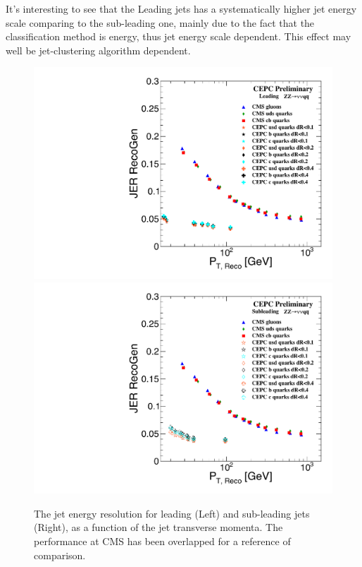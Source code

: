It's interesting to see that the Leading jets has a systematically higher jet energy scale comparing to the sub-leading one,
mainly due to the fact that the classification method is energy, thus jet energy scale dependent.
This effect may well be jet-clustering algorithm dependent. 

\begin{figure}[h!]
\centering
\includegraphics[scale=0.30]{Figures/Performance/peizhu/Compare_CMS2.pdf}
\includegraphics[scale=0.30]{Figures/Performance/peizhu/Compare_CMS3.pdf}
\caption{The jet energy resolution for leading (Left) and sub-leading jets (Right),
  as a function of the jet transverse momenta. The performance at CMS has been overlapped for a reference of comparison.  }
\label{fig:jet-comparision}
\end{figure}



